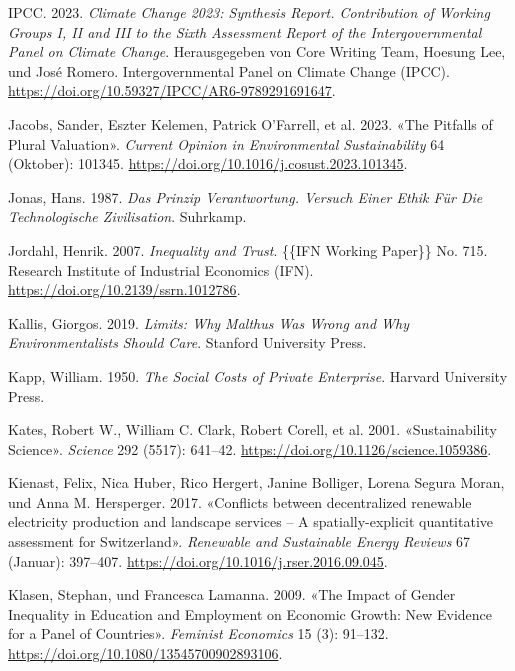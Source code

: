 \documentclass[
  nswissgerman,
  a4paper,
  DIV=11,
  numbers=noendperiod,
  oneside,
  openany]{scrreprt}
\newlength{\cslhangindent}
\newenvironment{CSLReferences}[2] %
 {\begin{list}{}{%
  \setlength{\itemindent}{0pt}
  \setlength{\leftmargin}{0pt}
  \setlength{\parsep}{0pt}
  \ifodd #1
   \setlength{\leftmargin}{\cslhangindent}
   \setlength{\itemindent}{-1\cslhangindent}
  \fi
  \setlength{\itemsep}{#2\baselineskip}}}
 {\end{list}}
\begin{document}
\begin{CSLReferences}{1}{1}
IPCC. 2023. \emph{Climate {Change} 2023: {Synthesis Report}.
{Contribution} of {Working Groups I}, {II} and {III} to the {Sixth
Assessment Report} of the {Intergovernmental Panel} on {Climate
Change}}. Herausgegeben von Core Writing Team, Hoesung Lee, und José
Romero. Intergovernmental Panel on Climate Change (IPCC).
\url{https://doi.org/10.59327/IPCC/AR6-9789291691647}.

Jacobs, Sander, Eszter Kelemen, Patrick O'Farrell, et al. 2023. {«The
Pitfalls of Plural Valuation»}. \emph{Current Opinion in Environmental
Sustainability} 64 (Oktober): 101345.
\url{https://doi.org/10.1016/j.cosust.2023.101345}.

Jonas, Hans. 1987. \emph{Das {Prinzip Verantwortung}. {Versuch} Einer
{Ethik} F{ü}r Die Technologische {Zivilisation}}. Suhrkamp.

Jordahl, Henrik. 2007. \emph{Inequality and {Trust}}. \{\{IFN Working
Paper\}\} No. 715. Research Institute of Industrial Economics (IFN).
\url{https://doi.org/10.2139/ssrn.1012786}.

Kallis, Giorgos. 2019. \emph{Limits: {Why Malthus Was Wrong} and {Why
Environmentalists Should Care}}. Stanford University Press.

Kapp, William. 1950. \emph{The {Social Costs} of {Private Enterprise}}.
Harvard University Press.

Kates, Robert W., William C. Clark, Robert Corell, et al. 2001.
{«Sustainability {Science}»}. \emph{Science} 292 (5517): 641--42.
\url{https://doi.org/10.1126/science.1059386}.

Kienast, Felix, Nica Huber, Rico Hergert, Janine Bolliger, Lorena Segura
Moran, und Anna M. Hersperger. 2017. {«Conflicts between decentralized
renewable electricity production and landscape services -- {A}
spatially-explicit quantitative assessment for {Switzerland}»}.
\emph{Renewable and Sustainable Energy Reviews} 67 (Januar): 397--407.
\url{https://doi.org/10.1016/j.rser.2016.09.045}.

Klasen, Stephan, und Francesca Lamanna. 2009. {«The {Impact} of {Gender
Inequality} in {Education} and {Employment} on {Economic Growth}: {New
Evidence} for a {Panel} of {Countries}»}. \emph{Feminist Economics} 15
(3): 91--132. \url{https://doi.org/10.1080/13545700902893106}.


\end{CSLReferences}
\end{document}
